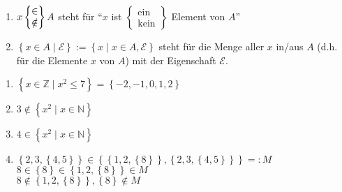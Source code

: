 \documentclass[../../main.tex]{subfiles}
\begin{document}
\begin{nt}\label{1.1.9}
\begin{enumerate}[\normalfont(a)]
\item $x\begin{Bmatrix}\in\\\notin\index{Menge@{\bf Menge}!e@$\in$ oder $\notin$}\end{Bmatrix} A$ steht für "`$x$ ist $\begin{Bmatrix}\text{ein}\\\text{kein}\end{Bmatrix}$ Element von $A$"'
\item $\left\{x\in A\mid \mathcal{E}\right\}:=\left\{x\mid x\in A ,\mathcal{E}\right\}$ steht für die Menge aller $x$ in/aus $A$ (d.h. für die Elemente $x$ von $A$) mit der Eigenschaft $\mathcal{E}$.
\end{enumerate}
\end{nt}

\begin{bsp}\label{1.1.10}
\begin{enumerate}[\normalfont(a)]
\item $\left\{x\in\mathbb{Z}\mid x^2\leq 7\right\}=\left\{-2,-1,0,1,2\right\}$
\item $3\notin\left\{x^2\mid x\in\mathbb{N}\right\}$
\item $4\in \left\{x^2\mid x\in\mathbb{N}\right\}$
\item $\left\{2,3,\left\{4,5\right\}\right\}\in\left\{\left\{1,2,\left\{8\right\}\right\},\left\{2,3,\left\{4,5\right\}\right\}\right\}=:M$\\
$8\in\left\{8\right\}\in\left\{1,2,\left\{8\right\}\right\}\in M$\\
$8\notin\left\{1,2,\left\{8\right\}\right\}, \left\{8\right\}\notin M$
\end{enumerate}
\end{bsp}
\end{document}
